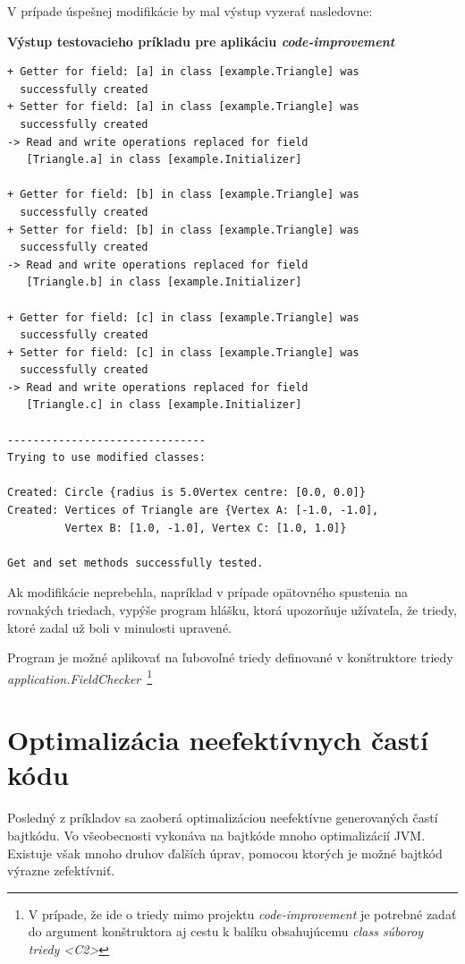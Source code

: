 \documentclass[11pt,final,oneside]{fithesis}
\newenvironment{example}[1]
{
\vspace{3mm}
\noindent\textbf{#1}
\vspace{2mm}
}
{
\vspace{3mm}
}
\begin{document}
V prípade úspešnej modifikácie by mal výstup vyzerať nasledovne:

\begin{example}{Výstup testovacieho príkladu pre aplikáciu \textit{code-improvement}}
\begin{verbatim}
+ Getter for field: [a] in class [example.Triangle] was
  successfully created
+ Setter for field: [a] in class [example.Triangle] was
  successfully created
-> Read and write operations replaced for field
   [Triangle.a] in class [example.Initializer]

+ Getter for field: [b] in class [example.Triangle] was
  successfully created
+ Setter for field: [b] in class [example.Triangle] was
  successfully created
-> Read and write operations replaced for field
   [Triangle.b] in class [example.Initializer]

+ Getter for field: [c] in class [example.Triangle] was
  successfully created
+ Setter for field: [c] in class [example.Triangle] was
  successfully created
-> Read and write operations replaced for field
   [Triangle.c] in class [example.Initializer]

-------------------------------
Trying to use modified classes: 

Created: Circle {radius is 5.0Vertex centre: [0.0, 0.0]}
Created: Vertices of Triangle are {Vertex A: [-1.0, -1.0],
         Vertex B: [1.0, -1.0], Vertex C: [1.0, 1.0]}

Get and set methods successfully tested.
\end{verbatim}
\end{example}

Ak modifikácie neprebehla, napríklad v prípade opätovného spustenia na rovnakých triedach, vypýše program hlášku, ktorá upozorňuje užívateľa, že triedy, ktoré zadal už boli v minulosti upravené.

Program je možné aplikovať na ľubovoľné triedy definované v konštruktore triedy \textit{application.FieldChecker}~\footnote{V prípade, že ide o triedy mimo projektu \textit{code-improvement} je potrebné zadať do argument konštruktora aj cestu k balíku obsahujúcemu \textit{class súboroy triedy <C2>}}

\section{Optimalizácia neefektívnych častí kódu}
Posledný z príkladov sa zaoberá optimalizáciou neefektívne generovaných častí bajtkódu. Vo všeobecnosti vykonáva na bajtkóde mnoho optimalizácií JVM. Existuje však mnoho druhov ďalších úprav, pomocou ktorých je možné bajtkód výrazne zefektívniť.
\end{document}
